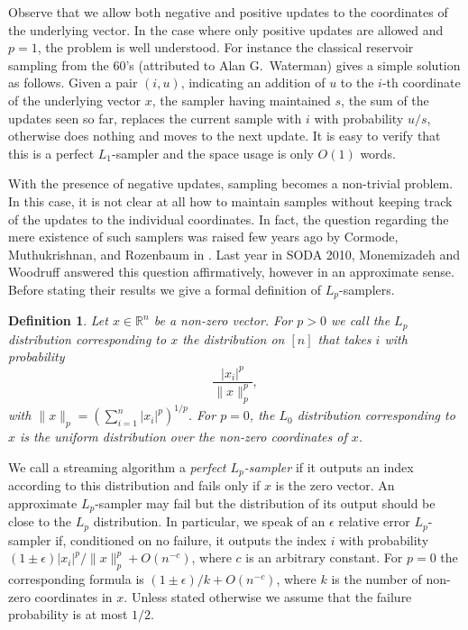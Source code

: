 \documentclass[9pt,letterpaper]{article}
\newtheorem{definition}{Definition}
\theoremstyle{remark}
\begin{document}
Observe that we allow both negative and positive updates to the coordinates of the underlying vector.
In the case where only positive updates are allowed and $p=1$, the problem is well understood.
    For instance the classical reservoir sampling \cite{Knuth69} from the 60's
    (attributed to Alan G.~Waterman) gives a simple 
    solution as follows. Given a pair $(i,u)$, 
    indicating an addition of $u$ to the  $i$-th coordinate of 
    the underlying vector $x$, the sampler having maintained $s$, the sum of the 
    updates seen so far, replaces
     the current sample with $i$ with probability $u/s$, otherwise does nothing 
     and moves to the next update. It is easy to verify that this is a perfect
     $L_1$-sampler and the space usage is only $O(1)$ words.
    
   With the presence of negative updates, sampling becomes a non-trivial problem. In this case,
   it is not clear at all how to maintain samples without keeping track of the updates
    to the individual coordinates. In fact, the question
    regarding the mere existence of such samplers was raised few years ago by Cormode,
    Muthukrishnan, and Rozenbaum in \cite{CormodeMR05}. Last year in SODA 2010, 
    Monemizadeh and Woodruff \cite{MonemizadehW10} answered this question
    affirmatively, however in an approximate sense. Before stating 
     their results we give a formal definition of 
    $L_p$-samplers.

\begin{definition}
Let $x \in \mathbb{R}^n$ be a non-zero vector. For
$p>0$ we call the {\em $L_p$ distribution} corresponding to $x$ the
distribution on $[n]$ that takes $i$ with probability
$$\frac{|x_i|^p}{\|x\|_p^p},$$
with $\|x\|_p=(\sum_{i=1}^n|x_i|^p)^{1/p}$. For $p=0$,
the $L_0$ distribution
corresponding to $x$ is the uniform distribution over the non-zero coordinates
of $x$.
\end{definition}

We call a streaming algorithm a {\em perfect $L_p$-sampler} if it outputs an
index according to this distribution and fails only if $x$ is the zero
vector. An approximate $L_p$-sampler may fail but the distribution of its
output should be close to the $L_p$ distribution. In particular, we speak of an $\epsilon$ relative
error $L_p$-sampler if, conditioned on no failure, it outputs the index $i$
with probability $(1\pm\epsilon)|x_i|^p/\|x\|_p^p+O(n^{-c})$, where $c$ is an
arbitrary constant. For $p=0$ the corresponding formula is
$(1\pm\epsilon)/k+O(n^{-c})$, where $k$ is the number of non-zero coordinates
in $x$. Unless stated otherwise we assume
that the failure probability is at most $1/2$.
\end{document}
